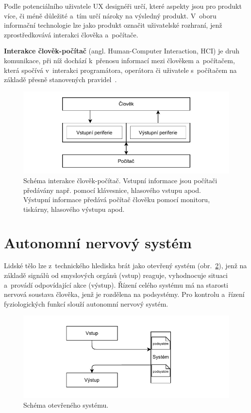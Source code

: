     Podle potenciálního uživatele UX designéři určí, které aspekty jsou pro produkt více, či méně důležité a~tím určí nároky na výsledný produkt. V~oboru informační technologie lze jako produkt označit uživatelské rozhraní, jenž zprostředkovává interakci člověka a~počítače.
    
    \vspace{5mm}
    
     \textbf{Interakce člověk-počítač} (angl. Human-Computer Interaction, HCI) je druh komunikace, při níž dochází k~přenosu informací mezi člověkem a~počítačem, která spočívá v~interakci programátora, operátora či uživatele s~počítačem na základě přesně stanovených pravidel~\cite{hci}. 
    
    \begin{figure}[H]
        \centering
        \includegraphics[width=\textwidth]{obrazky-figures/HCI.pdf}
        \caption{Schéma interakce člověk-počítač.  Vstupní informace jsou počítači předávány např. pomocí klávesnice, hlasového vstupu apod. Výstupní informace předává počítač člověku pomocí monitoru, tiskárny, hlasového výstupu apod.~\cite{hci}}
        \label{fig:hci}
    \end{figure}
    
    
    \section{Autonomní nervový systém}
    \label{nervous_system}
    
    Lidské tělo lze z~technického hlediska brát jako otevřený systém (obr.~\ref{fig:human_system}), jenž na základě signálů od smyslových orgánů (vstup) reaguje, vyhodnocuje situaci a~provádí odpovídající akce (výstup). Řízení celého systému má na starosti nervová soustava člověka, jenž je rozdělena na podsystémy. Pro kontrolu a~řízení fyziologických funkcí slouží autonomní nervový systém. 
    
    \begin{figure}[H]
        \centering
        \includegraphics[width=\textwidth]{obrazky-figures/human_system.pdf}
        \caption{Schéma otevřeného systému.}
        \label{fig:human_system}
    \end{figure}
    
